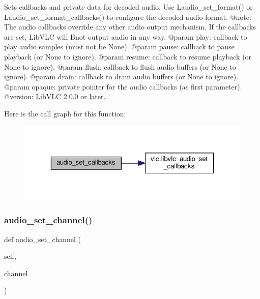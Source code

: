 \begin{DoxyVerb}Sets callbacks and private data for decoded audio.
Use L{audio_set_format}() or L{audio_set_format_callbacks}()
to configure the decoded audio format.
@note: The audio callbacks override any other audio output mechanism.
If the callbacks are set, LibVLC will B{not} output audio in any way.
@param play: callback to play audio samples (must not be None).
@param pause: callback to pause playback (or None to ignore).
@param resume: callback to resume playback (or None to ignore).
@param flush: callback to flush audio buffers (or None to ignore).
@param drain: callback to drain audio buffers (or None to ignore).
@param opaque: private pointer for the audio callbacks (as first parameter).
@version: LibVLC 2.0.0 or later.
\end{DoxyVerb}
 Here is the call graph for this function\+:
\nopagebreak
\begin{figure}[H]
\begin{center}
\leavevmode
\includegraphics[width=323pt]{classvlc_1_1_media_player_a327e9a7e6662ac47c17b3495a506ef38_cgraph}
\end{center}
\end{figure}
\mbox{\label{classvlc_1_1_media_player_ae2b42843e5513b17e8d0e601a7cfe6fb}} 
\subsubsection{\texorpdfstring{audio\+\_\+set\+\_\+channel()}{audio\_set\_channel()}}
{\footnotesize\ttfamily def audio\+\_\+set\+\_\+channel (\begin{DoxyParamCaption}\item[{}]{self,  }\item[{}]{channel }\end{DoxyParamCaption})}

